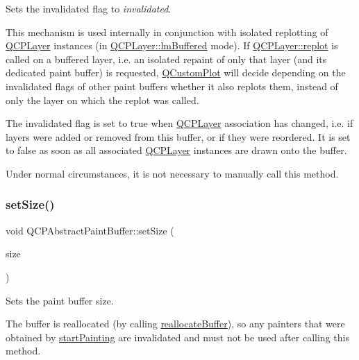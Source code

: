 Sets the invalidated flag to {\itshape invalidated}.

This mechanism is used internally in conjunction with isolated replotting of \hyperlink{class_q_c_p_layer}{Q\+C\+P\+Layer} instances (in \hyperlink{class_q_c_p_layer_a67dcfc1590be2a1f2227c5a39bb59c7cab581b9fab3007c4c65f057f4185d7538}{Q\+C\+P\+Layer\+::lm\+Buffered} mode). If \hyperlink{class_q_c_p_layer_adefd53b6db02f470151c416f42e37180}{Q\+C\+P\+Layer\+::replot} is called on a buffered layer, i.\+e. an isolated repaint of only that layer (and its dedicated paint buffer) is requested, \hyperlink{class_q_custom_plot}{Q\+Custom\+Plot} will decide depending on the invalidated flags of other paint buffers whether it also replots them, instead of only the layer on which the replot was called.

The invalidated flag is set to true when \hyperlink{class_q_c_p_layer}{Q\+C\+P\+Layer} association has changed, i.\+e. if layers were added or removed from this buffer, or if they were reordered. It is set to false as soon as all associated \hyperlink{class_q_c_p_layer}{Q\+C\+P\+Layer} instances are drawn onto the buffer.

Under normal circumstances, it is not necessary to manually call this method. \mbox{\label{class_q_c_p_abstract_paint_buffer_a8b68c3cd36533f1a4a23b5ce8cd66f01}} 
\subsubsection{\texorpdfstring{set\+Size()}{setSize()}}
{\footnotesize\ttfamily void Q\+C\+P\+Abstract\+Paint\+Buffer\+::set\+Size (\begin{DoxyParamCaption}\item[{const Q\+Size \&}]{size }\end{DoxyParamCaption})}

Sets the paint buffer size.

The buffer is reallocated (by calling \hyperlink{class_q_c_p_abstract_paint_buffer_aee7506a52bd7e5a07c2af27935eb13e7}{reallocate\+Buffer}), so any painters that were obtained by \hyperlink{class_q_c_p_abstract_paint_buffer_a9e9f29b19c033cf02fb96f1a148463f3}{start\+Painting} are invalidated and must not be used after calling this method.

